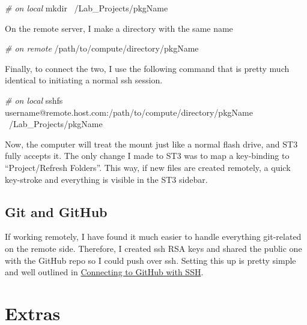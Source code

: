 \documentclass[]{book}
\newenvironment{Shaded}{\begin{snugshade}}{\end{snugshade}}
\newcommand{\CommentTok}[1]{\textcolor[rgb]{0.56,0.35,0.01}{\textit{#1}}}
\newcommand{\ExtensionTok}[1]{#1}
\newcommand{\FunctionTok}[1]{\textcolor[rgb]{0.00,0.00,0.00}{#1}}
\newcommand{\NormalTok}[1]{#1}
\begin{document}
\begin{Shaded}
\begin{Highlighting}[]
\CommentTok{# on local}
\FunctionTok{mkdir}\NormalTok{ ~/Lab_Projects/pkgName}
\end{Highlighting}
\end{Shaded}

On the remote server, I make a directory with the same name

\begin{Shaded}
\begin{Highlighting}[]
\CommentTok{# on remote}
\ExtensionTok{/path/to/compute/directory/pkgName}
\end{Highlighting}
\end{Shaded}

Finally, to connect the two, I use the following command that is pretty much identical to initiating a normal ssh session.

\begin{Shaded}
\begin{Highlighting}[]
\CommentTok{# on local}
\ExtensionTok{sshfs}\NormalTok{ username@remote.host.com:/path/to/compute/directory/pkgName ~/Lab_Projects/pkgName}
\end{Highlighting}
\end{Shaded}

Now, the computer will treat the mount just like a normal flash drive, and ST3 fully accepts it. The only change I made to ST3 was to map a key-binding to ``Project/Refresh Folders''. This way, if new files are created remotely, a quick key-stroke and everything is visible in the ST3 sidebar.

\hypertarget{git-and-github-1}{%
\subsection{Git and GitHub}\label{git-and-github-1}}

If working remotely, I have found it much easier to handle everything git-related on the remote side. Therefore, I created ssh RSA keys and shared the public one with the GitHub repo so I could push over ssh. Setting this up is pretty simple and well outlined in \href{https://help.github.com/en/articles/connecting-to-github-with-ssh}{Connecting to GitHub with SSH}.

\hypertarget{extras}{%
\section{Extras}\label{extras}}
\end{document}
